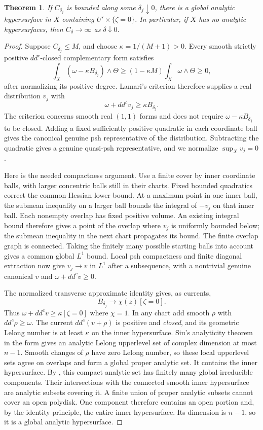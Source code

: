 \documentclass[11pt]{article}
\newtheorem{theorem}{Theorem}
\theoremstyle{remark}\newtheorem{remark}{Remark}
\newcommand{\ddc}{dd^c}
\begin{document}
\begin{theorem}\label{thm:concentration}
If $C_{\delta_j}$ is bounded along some $\delta_j\downarrow0$, there
is a global analytic hypersurface in $X$ containing
$U'\times\{\zeta=0\}$. In particular, if $X$ has no analytic
hypersurfaces, then $C_\delta\to\infty$ as $\delta\downarrow0$.
\end{theorem}
\begin{proof}
Suppose $C_{\delta_j}\leq M$, and choose $\kappa=1/(M+1)>0$.
Every smooth strictly positive $\ddc$-closed complementary form satisfies
\[
 \int_X(\omega-\kappa B_{\delta_j})\wedge\Theta
       \geq(1-\kappa M)\int_X\omega\wedge\Theta\geq0,
\]
after normalizing its positive degree. Lamari's criterion
\cite[Lemma 3.3]{Lamari} therefore supplies a real distribution $v_j$
with
\[
 \omega+\ddc v_j\geq\kappa B_{\delta_j}.
\]
The criterion concerns smooth real $(1,1)$ forms and does not require
$\omega-\kappa B_{\delta_j}$ to be closed. Adding a fixed sufficiently
positive quadratic in each coordinate ball gives the canonical genuine
psh representative of the distribution. Subtracting the quadratic gives
a genuine quasi-psh representative, and we normalize $\sup_Xv_j=0$.

Here is the needed compactness argument. Use a finite cover by inner
coordinate balls, with larger concentric balls still in their charts.
Fixed bounded quadratics correct the common Hessian lower bound. At a
maximum point in one inner ball, the submean inequality on a larger ball
bounds the integral of $-v_j$ on that inner ball. Each nonempty overlap
has fixed positive volume. An existing integral bound therefore gives a
point of the overlap where $v_j$ is uniformly bounded below; the submean
inequality in the next chart propagates its bound. The finite overlap
graph is connected. Taking the finitely many possible starting balls
into account gives a common global $L^1$ bound. Local psh compactness
\cite[I.5.8--5.9]{Demailly} and finite diagonal extraction now give
$v_j\to v$ in $L^1$ after a subsequence, with a nontrivial genuine
canonical $v$ and $\omega+\ddc v\geq0$.

The normalized transverse approximate identity gives, as currents,
\[
 B_{\delta_j}\longrightarrow\chi(z)[\zeta=0].
\]
Thus $\omega+\ddc v\geq\kappa[\zeta=0]$ where $\chi=1$.
In any chart add smooth $\rho$ with $\ddc\rho\geq\omega$.
The current $\ddc(v+\rho)$ is positive and \emph{closed}, and its
geometric Lelong number is at least $\kappa$ on the inner hypersurface.
Siu's analyticity theorem in the form
\cite[III.8.5]{Demailly} gives an analytic Lelong upperlevel set of
complex dimension at most $n-1$. Smooth changes of $\rho$ have zero
Lelong number, so these local upperlevel sets agree on overlaps and
form a global proper analytic set. It contains the inner hypersurface. By \cite[II.5.3]{Demailly},
this compact analytic set has finitely many global irreducible components.
Their intersections with the connected smooth inner hypersurface are
analytic subsets covering it. A finite union of proper analytic subsets
cannot cover an open polydisk. One component therefore contains an open
portion and, by the identity principle, the entire inner hypersurface.
Its dimension is $n-1$, so it is a global analytic hypersurface.


\end{proof}
\end{document}
